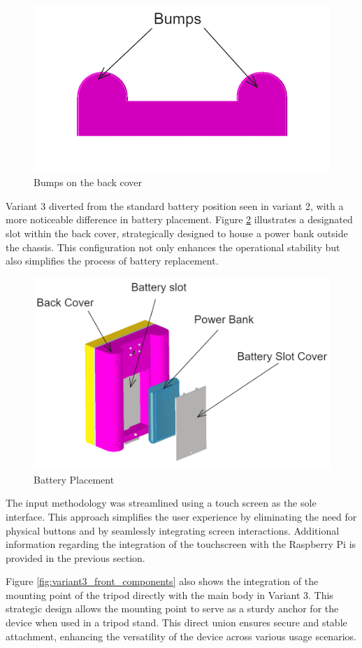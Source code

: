 \begin{figure}[h!]
    \centering
    \includegraphics[width=0.5\linewidth]{texs/Part1/chapter4/image/v34.png}
    \caption{Bumps on the back cover}
    \label{fig:variant3_bumps}
\end{figure}

Variant 3 diverted from the standard battery position seen in variant 2, with a more noticeable difference in battery placement. Figure \ref{fig:variant3_battery_placement} illustrates a designated slot within the back cover, strategically designed to house a power bank outside the chassis. This configuration not only enhances the operational stability but also simplifies the process of battery replacement.

\begin{figure}[h!]
    \centering
    \includegraphics[width=0.5\linewidth]{texs/Part1/chapter4/image/v35.png}
    \caption{Battery Placement}
    \label{fig:variant3_battery_placement}
\end{figure}

The input methodology was streamlined using a touch screen as the sole interface. This approach simplifies the user experience by eliminating the need for physical buttons and by seamlessly integrating screen interactions. Additional information regarding the integration of the touchscreen with the Raspberry Pi is provided in the previous section.

Figure \ref{fig:variant3_front_components} also shows the integration of the mounting point of the tripod directly with the main body in Variant 3. This strategic design allows the mounting point to serve as a sturdy anchor for the device when used in a tripod stand. This direct union ensures secure and stable attachment, enhancing the versatility of the device across various usage scenarios.

